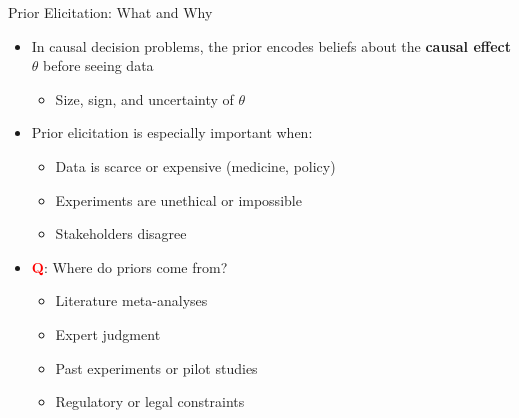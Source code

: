 \documentclass[
  10pt,
  ignorenonframetext,
]{beamer}
\providecommand{\tightlist}{%
  \setlength{\itemsep}{0pt}\setlength{\parskip}{0pt}}
\begin{document}
\begin{frame}{Prior Elicitation: What and Why}
\label{prior-elicitation-what-and-why}
\begin{itemize}
\tightlist
\item
  In causal decision problems, the prior encodes beliefs about the
  \textbf{causal effect} \(\theta\) before seeing data

  \begin{itemize}
  \tightlist
  \item
    Size, sign, and uncertainty of \(\theta\)
  \end{itemize}
\item
  Prior elicitation is especially important when:

  \begin{itemize}
  \tightlist
  \item
    Data is scarce or expensive (medicine, policy)
  \item
    Experiments are unethical or impossible
  \item
    Stakeholders disagree
  \end{itemize}
\item
  \textbf{\textcolor{red}{Q}}: Where do priors come from?

  \begin{itemize}
  \tightlist
  \item
    Literature meta-analyses
  \item
    Expert judgment
  \item
    Past experiments or pilot studies
  \item
    Regulatory or legal constraints
  \end{itemize}
\end{itemize}
\end{frame}
\end{document}
